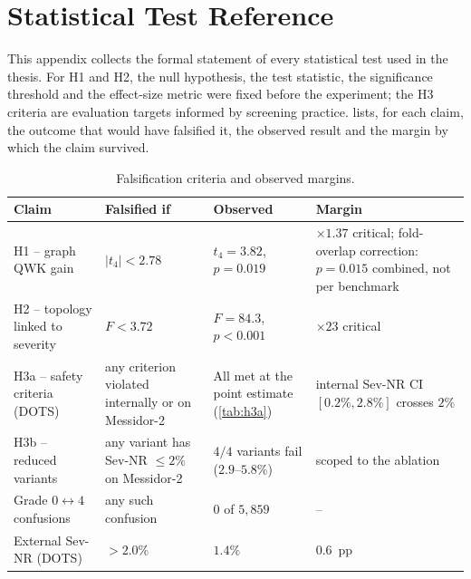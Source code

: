 \chapter{Statistical Test Reference}
\label{app:stats}

This appendix collects the formal statement of every statistical test used in the thesis.
For H1 and H2, the null hypothesis, the test statistic, the significance threshold and the
effect-size metric were fixed before the experiment; the H3 criteria are evaluation
targets informed by screening practice.  lists, for each claim, the outcome that would have falsified it,
the observed result and the margin by which the claim survived.

\begin{table}[!htbp]
\centering
\caption[Falsification criteria and observed margins]{Falsification criteria and observed margins.}
\label{tab:falsif}
\small
\begin{tabular}{@{}P{4.2cm}P{3.0cm}P{4.3cm}P{2.9cm}@{}}
\toprule
Claim & Falsified if & Observed & Margin \\
\midrule
H1 -- graph QWK gain & $|t_4| < 2.78$ & $t_4=3.82$, $p=0.019$ & $\times1.37$ critical; fold-overlap correction: $p=0.015$ combined, not per benchmark \\
H2 -- topology linked to severity & $F < 3.72$ & $F=84.3$, $p<0.001$ & $\times23$ critical \\
H3a -- safety criteria (DOTS) & any criterion violated internally or on Messidor-2 & All met at the point estimate (\cref{tab:h3a}) & internal Sev-NR CI $[0.2\%,2.8\%]$ crosses $2\%$ \\
H3b -- reduced variants & any variant has Sev-NR $\leq2\%$ on Messidor-2 & $4/4$ variants fail ($2.9$--$5.8\%$) & scoped to the ablation \\
Grade $0\leftrightarrow4$ confusions & any such confusion & $0$ of $5{,}859$ & -- \\
External Sev-NR (DOTS) & $>2.0\%$ & $1.4\%$ & $0.6$~pp \\
\bottomrule
\end{tabular}
\end{table}

